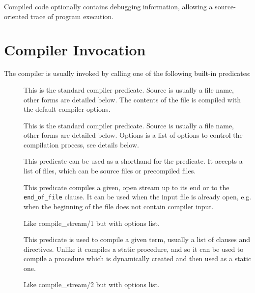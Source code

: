 Compiled code optionally contains debugging information, allowing a
source-oriented trace of program execution.


\section{Compiler Invocation}

The compiler is usually invoked by calling one of the following built-in
predicates:
\begin{description}
\item[]
This is the standard compiler predicate.
Source is usually a file name, other forms are detailed below.
The contents of the file is compiled with the default compiler options.

\item[]
This is the standard compiler predicate.
Source is usually a file name, other forms are detailed below.
Options is a list of options to control the compilation process, see details below.

\item[]
This predicate can be used as a shorthand for the
predicate.
It accepts a list of files, which can be source files or precompiled files.

\item[]
This predicate compiles a given, open stream up to its end
or to the {\tt end_of_file} clause.
It can be used when the input file is already open,
e.g. when the beginning of the file does not contain
compiler input.

\item[]
Like compile_stream/1 but with options list.

\item[]
This predicate is used to compile a given term,
usually a list of clauses and directives.
Unlike  it compiles
a static procedure,
and so it can be used to compile a procedure which is dynamically
created and then used as a static one.

\item[]
Like compile_stream/2 but with options list.
\end{description}

